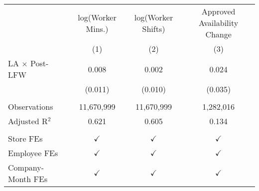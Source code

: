 
\begingroup
\centering
\scriptsize
\begin{tabular}{lccc}
   \toprule
                         & log(Worker Mins.)    & log(Worker Shifts)   & Approved Availability Change\\  
                         & (1)           & (2)           & (3)\\  
   \midrule 
   LA $\times$ Post-LFW  & 0.008         & 0.002         & 0.024\\   
                         & (0.011)       & (0.010)       & (0.035)\\   
    \\
   Observations          & 11,670,999    & 11,670,999    & 1,282,016\\  
   Adjusted R$^2$        & 0.621         & 0.605         & 0.134\\  
    \\
   Store FEs             & $\checkmark$  & $\checkmark$  & $\checkmark$\\   
   Employee FEs          & $\checkmark$  & $\checkmark$  & $\checkmark$ \\  
   Company-Month FEs     & $\checkmark$  & $\checkmark$  & $\checkmark$\\   
   \bottomrule
\end{tabular}
\par\endgroup





